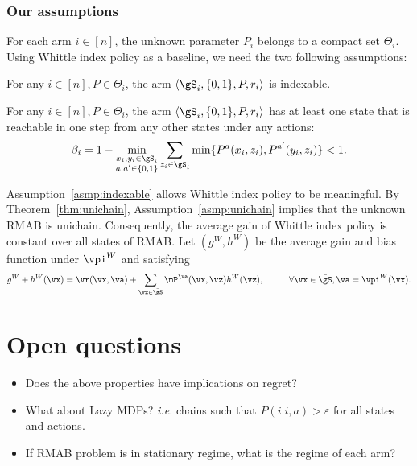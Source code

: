 \subsubsection{Our assumptions}

For each arm $i\in[n]$, the unknown parameter $P_i$ belongs to a compact set $\Theta_i$.
Using Whittle index policy as a baseline, we need the two following assumptions:
\begin{asmp}
    \label{asmp:indexable}
    For any $i\in[n], P\in\Theta_i$, the arm $\langle\gS_i,\{0,1\},P,r_i\rangle$ is indexable.
\end{asmp}
\begin{asmp}
    \label{asmp:unichain}
    For any $i\in[n], P\in\Theta_i$, the arm $\langle\gS_i,\{0,1\},P,r_i\rangle$ has at least one state that is reachable in one step from any other states under any actions:
    \begin{align*}
        \beta_i = 1-\min_{\substack{x_i,y_i\in\gS_i \\a,a'\in\{0,1\}}} \sum_{z_i\in\gS_i} \min\{P^{a}(x_i,z_i), P^{a'}(y_i,z_i)\}<1.
    \end{align*}
\end{asmp}

Assumption~\ref{asmp:indexable} allows Whittle index policy to be meaningful.
By Theorem~\ref{thm:unichain}, Assumption~\ref{asmp:unichain} implies that the unknown RMAB is unichain. Consequently, the average gain of Whittle index policy is constant over all states of RMAB.
Let $(g^W, h^W)$ be the average gain and bias function under $\vpi^W$ and satisfying
\begin{align}
    g^W + h^W(\vx) = \vr(\vx,\va) +\sum_{\vz\in\bar{\gS}} \mP^{\va}(\vx, \vz)h^W(\vz),\hspace{1cm} \forall \vx\in\bar{\gS}, \va=\vpi^W(\vx). \label{eq:bellman}
\end{align}

\section{Open questions}

\begin{itemize}
    \item Does the above properties have implications on regret? 
    \item What about Lazy MDPs? \emph{i.e.} chains such that $P(i | i,a)>\varepsilon$ for all states and actions.
    \item If RMAB problem is in stationary regime, what is the regime of each arm?
\end{itemize}

\endgroup
